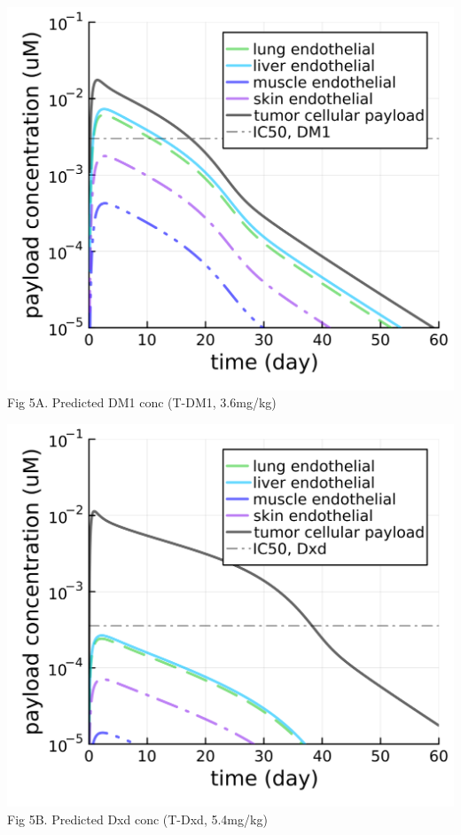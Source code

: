\documentclass[portrait,fontscale=0.3,paperwidth=36in,paperheight=48in]{baposter}
\begin{document}
\begin{poster}
{\begin{minipage}[c]{0.33\linewidth}
\centering
\includegraphics[width= 0.8 \textwidth]{../img/t-dm1-tissue-payload-conc.png} \\ 
\scriptsize{Fig 5A. Predicted DM1 conc (T-DM1, 3.6mg/kg)}
\end{minipage}
\hspace{0.01\linewidth}
\begin{minipage}[c]{0.32\linewidth}
\centering
\includegraphics[width= 0.8 \textwidth]{../img/t-dxd-tissue-payload-conc.png} \\ 
\scriptsize{Fig 5B. Predicted Dxd conc (T-Dxd, 5.4mg/kg)}
\end{minipage}
\hspace{0.01\linewidth}
\begin{minipage}[c]{0.32\linewidth}
\centering

\end{minipage}}
\end{poster}
\end{document}
